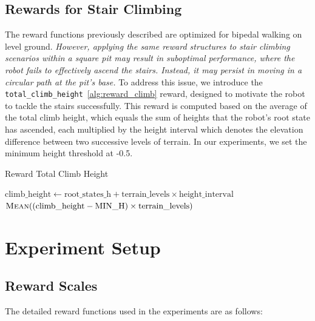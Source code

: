 \documentclass{article} %
\begin{document}
\subsection{Rewards for Stair Climbing}

The reward functions previously described are optimized for bipedal walking on level ground. \textit{However, applying the same reward structures to stair climbing scenarios within a square pit may result in suboptimal performance, where the robot fails to effectively ascend the stairs. Instead, it may persist in moving in a circular path at the pit's base.} To address this issue, we introduce the \texttt{total\_climb\_height}~\autoref{alg:reward_climb} reward, designed to motivate the robot to tackle the stairs successfully. This reward is computed based on the average of the total climb height, which equals the sum of heights that the robot's root state has ascended, each multiplied by the height interval which denotes the elevation difference between two successive levels of terrain. In our experiments, we set the minimum height threshold at -0.5.

\begin{algorithm}[H]
   \caption{Reward Total Climb Height}
   \label{alg:reward_climb}
   \begin{algorithmic}
       \State $\text{climb\_height} \gets \text{root\_states\_h} + \text{terrain\_levels} \times \text{height\_interval}$
       \State \Return $\Call{Mean}{(\text{climb\_height} - \text{MIN\_H}) \times \text{terrain\_levels}}$
   \EndFunction
   \end{algorithmic}
\end{algorithm}

\section{Experiment Setup}

\subsection{Reward Scales}

The detailed reward functions used in the experiments are as follows:
\end{document}

